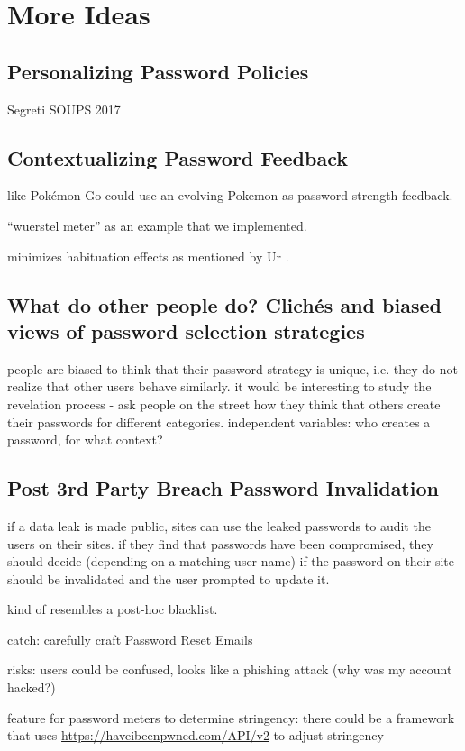 \chapter[More Ideas]{More Ideas}\label{chap:pst_ideas}

\section{Personalizing Password Policies}

Segreti \etal SOUPS 2017
\cite{Seitz2017PPT}
\cite{Segreti2017AdaptivePolicies}

\section{Contextualizing Password Feedback}
like \cite{Kroeze2012GamifyingAuthentication} Pokémon Go could use an evolving Pokemon as password strength feedback. 

``wuerstel meter'' as an example that we implemented.

minimizes habituation effects as mentioned by Ur \etal \cite{Ur2012HelpingUsersCreateBetterPasswords}.

\section{What do other people do? Clichés and biased views of password selection strategies}
people are biased to think that their password strategy is unique, i.e. they do not realize that other users behave similarly. it would be interesting to study the revelation process - ask people on the street how they think that others create their passwords for different categories. independent variables: who creates a password, for what context?

\section{Post 3rd Party Breach Password Invalidation}
if a data leak is made public, sites can use the leaked passwords to audit the users on their sites. if they find that passwords have been compromised, they should decide (depending on a matching user name) if the password on their site should be invalidated and the user prompted to update it.

kind of resembles a post-hoc blacklist.  

catch: carefully craft Password Reset Emails \cite{Kim2017TooBusy}

risks: users could be confused, looks like a phishing attack (why was my account hacked?)

feature for password meters to determine stringency: 
there could be a framework that uses \url{https://haveibeenpwned.com/API/v2} to adjust stringency 

